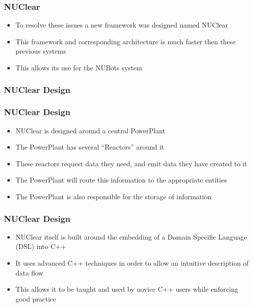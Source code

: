 \documentclass{beamer}
\begin{document}
\begin{frame}
	\frametitle{NUClear}
	\begin{itemize}
		\item To resolve these issues a new framework was designed named NUClear
		\item This framework and corresponding architecture is much faster then these previous systems
		\item This allows its use for the NUBots system
	\end{itemize}
\end{frame}

\begin{frame}
	\frametitle{NUClear Design}
	\centering
\end{frame}

\begin{frame}
	\frametitle{NUClear Design}
	\begin{itemize}
		\item NUClear is designed around a central PowerPlant
		\item The PowerPlant has several ``Reactors'' around it
		\item These reactors request data they need, and emit data they have created to it
		\item The PowerPlant will route this information to the appropriate entities
		\item The PowerPlant is also responsible for the storage of information
	\end{itemize}
\end{frame}

\begin{frame}
	\frametitle{NUClear Design}
	\begin{itemize}
		\item NUClear itself is built around the embedding of a Domain Specific Language (DSL) into C++
		\item It uses advanced C++ techniques in order to allow an intuitive description of data flow
		\item This allows it to be taught and used by novice C++ users while enforcing good practice
	\end{itemize}
\end{frame}
\end{document}
